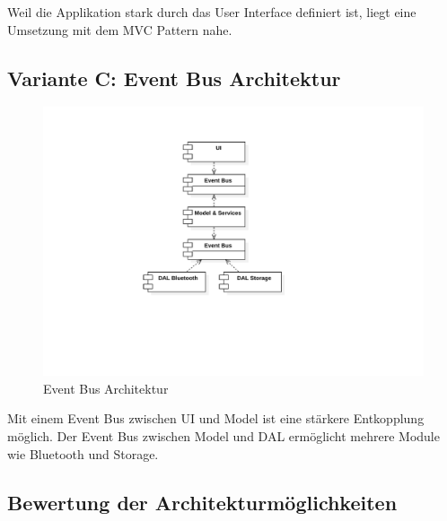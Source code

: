 Weil die Applikation stark durch das User Interface definiert ist, liegt eine Umsetzung mit dem MVC Pattern nahe.

\subsection{Variante C: Event Bus Architektur}
\begin{figure}[H]
    \begin{center}
        \includegraphics[trim=0 180 100 30,clip,width=\textwidth]{design/res/eventbus}
    \end{center}
    \caption{Event Bus Architektur}
\end{figure}

Mit einem Event Bus zwischen \ac{UI} und Model ist eine stärkere Entkopplung möglich\cite{fowler_event_collab}. Der Event Bus zwischen Model und \ac{DAL} ermöglicht mehrere Module wie Bluetooth und Storage.

\subsection[Bewertung der Architekturmöglichkeite]{Bewertung der Architekturmöglichkeiten \cite{gamma1994design}}

